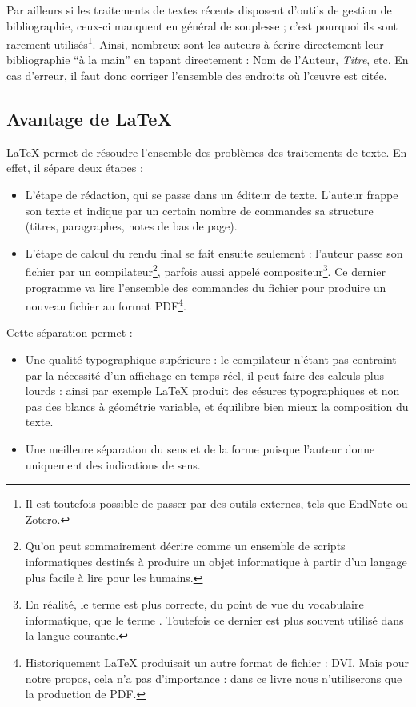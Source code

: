 Par ailleurs si les traitements de textes récents disposent d'outils de gestion de bibliographie, ceux-ci manquent en général de souplesse ; c'est pourquoi ils sont rarement utilisés\footnote{Il est toutefois possible de passer par des outils externes, tels que EndNote ou Zotero.}. Ainsi, nombreux sont les auteurs à écrire directement leur bibliographie \enquote{à la main} en tapant directement : Nom de l'Auteur, \emph{Titre}, etc. En cas d'erreur, il faut donc corriger l'ensemble des endroits où l'œuvre est citée.

\subsection{Avantage de \LaTeX{}}

\LaTeX{} permet de résoudre l'ensemble des problèmes des traitements de texte. En effet, il sépare deux étapes : 

\begin{itemize}
\item L'étape de rédaction, qui se passe dans un éditeur de texte. L'auteur frappe son texte et indique par un certain nombre de commandes sa structure (titres, paragraphes, notes de bas de page).
\item L'étape de calcul du rendu final se fait ensuite seulement  : l'auteur  passe son fichier par un compilateur\footnote{Qu'on peut sommairement décrire comme un ensemble de scripts informatiques destinés à produire un objet informatique à partir d'un langage plus facile à lire pour les humains.}, parfois aussi appelé compositeur\footnote{En réalité, le terme  est plus correcte, du point de vue du vocabulaire informatique, que le terme . Toutefois ce dernier est plus souvent utilisé dans la langue courante.}. Ce dernier programme va lire l'ensemble des commandes du fichier pour produire un nouveau fichier au format PDF\footnote{Historiquement \LaTeX{} produisait un autre format de fichier : DVI. Mais pour notre propos, cela n'a pas d'importance : dans ce livre nous n'utiliserons que la production de PDF.}.
\end{itemize}

Cette séparation permet :
\begin{itemize}
\item Une qualité typographique supérieure :  le compilateur n'étant pas contraint par la nécessité d'un affichage en temps réel, il peut faire des calculs plus lourds : ainsi par exemple \LaTeX{} produit des césures typographiques et non pas des blancs à géométrie variable, et équilibre bien mieux la composition du texte.
\item Une meilleure séparation du sens et de la forme puisque l'auteur donne uniquement des indications de sens.
\end{itemize}


